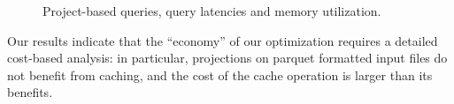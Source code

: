 \begin{figure}[!htb]
	\centering



   \caption{Project-based queries, query latencies and memory utilization.}
   \label{fig:query3}
\end{figure}

Our results indicate that the ``economy'' of our optimization requires a detailed cost-based analysis: in particular, projections on parquet formatted input files do not benefit from caching, and the cost of the cache operation is larger than its benefits.

